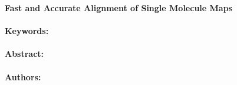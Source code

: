 \noindent
\large {\bf Fast and Accurate Alignment of Single Molecule Maps} 


\normalsize 


\noindent \paragraph{Keywords:} 

\noindent \paragraph{Abstract:} 



\noindent \paragraph{Authors:} 

